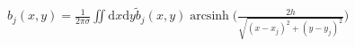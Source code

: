 \documentclass[12pt]{standalone}
\DeclareMathOperator{\arcsinh}{arcsinh}
\newcommand{\rd}{\mathrm{d}}
\begin{document}
$\displaystyle 
  b_j(x,y)=\frac{1}{2\pi\sigma}
  \iint \! \rd x \rd y \tilde{b}_j (x, y)
  \arcsinh \biggr(
  \frac{2 h } {\sqrt{(x-x_j)^2+(y-y_j)^2}}
  \biggl)
$
\end{document}
